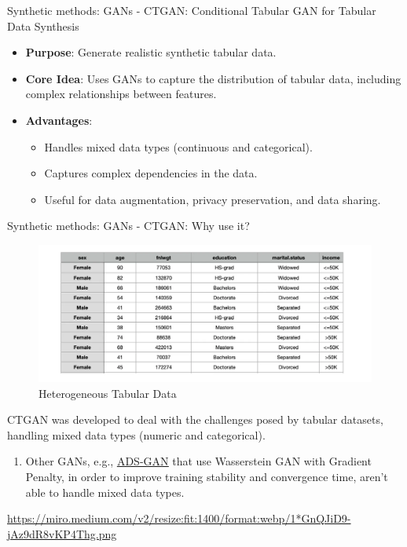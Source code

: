 \documentclass[
	aspectratio = 169
 ]{beamer}
\begin{document}
\begin{frame}{Synthetic methods: GANs - CTGAN: Conditional Tabular GAN for Tabular Data Synthesis}
   
    \begin{itemize}
        \item \textbf{Purpose}: Generate realistic synthetic tabular data.
        \item \textbf{Core Idea}: Uses GANs to capture the distribution of tabular data, including complex relationships between features.
        \item \textbf{Advantages}:
        \begin{itemize}
            \item Handles mixed data types (continuous and categorical).
            \item Captures complex dependencies in the data.
            \item Useful for data augmentation, privacy preservation, and data sharing.
        \end{itemize}
    \end{itemize}
    
\end{frame}
\begin{frame}{Synthetic methods: GANs - CTGAN: Why use it?}
 
  \begin{figure}
      \centering
      \includegraphics[width=0.5\linewidth]{Presentation TEX/gallery/table.png}
  \caption{Heterogeneous Tabular Data}
  \end{figure}
  CTGAN was developed to deal with the challenges posed by tabular datasets, handling mixed data types (numeric and categorical).
  \begin{enumerate}
      \item Other GANs, e.g., \href{https://pubmed.ncbi.nlm.nih.gov/32167919/}{\color{blue}\underline{ADS-GAN}} that use Wasserstein GAN with Gradient Penalty, in order to improve training stability and convergence time, aren't able to handle mixed data types.
  \end{enumerate}
  \vspace{2.5mm}
\tiny{\url{https://miro.medium.com/v2/resize:fit:1400/format:webp/1*GnQJiD9-jAz9dR8vKP4Thg.png}}

\end{frame}
\end{document}
